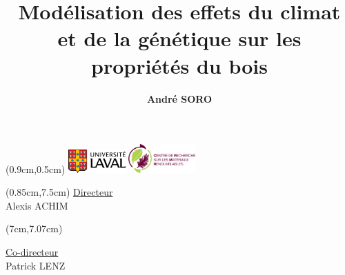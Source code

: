 \documentclass{beamer}
\begin{document}
	
\newcommand{\un}{\textunderscore}

\title[Projet de thèse de doctorat]{Modélisation des effets du climat et de la génétique sur les propriétés du bois} 
\author{\textbf{André SORO}}
\date{}

\begin{textblock*}{11cm}(0.9cm,0.5cm)
	\includegraphics[height = 0.9cm]{logo-universite-laval}
	\hfill
	\includegraphics[height = 1.1cm]{logo_crmr}
\end{textblock*}


\begin{textblock*}{5cm}(0.85cm,7.5cm)
	\underline{Directeur}\\
	Alexis ACHIM\\
\end{textblock*}
	
	
\begin{textblock*}{5cm}(7cm,7.07cm)
	\begin{flushright}
		\underline{Co-directeur}\\
	    Patrick LENZ\\
	\end{flushright}
\end{textblock*}
\end{document}
